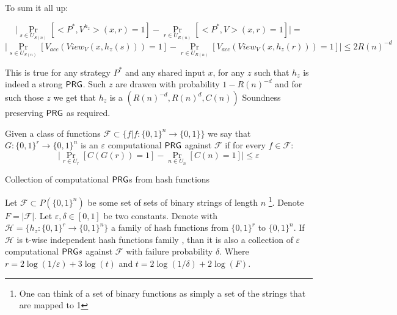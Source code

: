 \documentclass[11]{article}
\newenvironment{proof}[1][Proof]{\begin{trivlist}
\item[\hskip \labelsep {\bfseries #1}]}{\end{trivlist}}
\begin{document}
\begin{proof}
To sum it all up:

$$ \bigg| \Pr_{s \in U_{S(n)}} [<P^*, V^{h_z}>(x, r) = 1] - \Pr_{r \in U_{R(n)}}[<P^*, V>(x,r) = 1] \bigg| = $$
$$ \bigg| \Pr_{s \in U_{S(n)}} [V_{acc}(View_V(x, h_z(s))) = 1] - \Pr_{r \in U_{R(n)}} [V_{acc}(View_V(x, h_z(r))) = 1] \bigg| \leq 2R(n)^{-d}$$

This is true for any strategy $P^*$ and any shared input $x$, for any $z$ such that $h_z$ is indeed a strong $\mathsf{PRG}$. Such $z$ are drawen with probability $1 - R(n)^{-d}$ and for such those $z$ we get that $h_z$ is a $(R(n)^{-d}, R(n)^d, C(n))$ Soundness preserving $\mathsf{PRG}$ as required.

\end{proof}


Given a class of functions $\mathcal{F} \subset \{f | f: \{0,1\}^n \to \{0,1\}\}$ we say that $G: \{0,1\}^r \to \{0,1\}^n$ is an $\varepsilon$ computational $\mathsf{PRG}$ against $\mathcal{F}$ if for every $f \in \mathcal{F}$:
$$ \bigg| \Pr_{r \in U_r}[C(G(r)) = 1] - \Pr_{n \in U_n}[C(n) = 1] \bigg| \leq \varepsilon$$

\begin{claim} {Collection of computational $\mathsf{PRG}$s from hash functions}

Let $\mathcal{F} \subset P(\{0,1\}^n)$ be some set of sets of binary strings of length $n$ \footnote{One can think of a set of binary functions as simply a set of the strings that are mapped to 1}. Denote $F = |\mathcal{F}|$. Let $\varepsilon, \delta \in [0,1]$ be two constants. Denote with $\mathcal{H} = \{ h_z : \{0,1\}^r \to \{0,1 \}^n \}$ a family of hash functions from $\{0,1\}^r$ to $\{0,1\}^n$. If $\mathcal{H}$ is t-wise independent hash functions family , than it is also a collection of $\varepsilon$ computational $\mathsf{PRG} s$ against $\mathcal{F}$ with failure probability $\delta$. Where $r = 2\log(1 / \varepsilon) + 3\log(t)$ and $t = 2\log(1 / \delta) + 2\log (F)$.
\end{claim}
\end{document}
